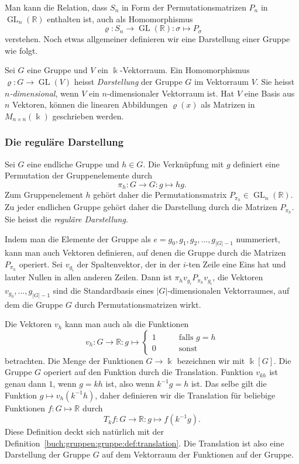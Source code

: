 Man kann die Relation, dass $S_n$ in Form der Permutationsmatrizen $P_n$
in $\operatorname{GL}_n(\mathbb{R})$ enthalten ist, auch als Homomorphismus
\[
\varrho
\colon 
S_n
\to
\operatorname{GL}(\mathbb{R})
:
\sigma
\mapsto
P_\sigma
\]
verstehen.
Noch etwas allgemeiner definieren wir eine Darstellung einer Gruppe
wie folgt.

\begin{definition}
Sei $G$ eine Gruppe und $V$ ein $\Bbbk$-Vektorraum.
Ein Homomorphismus $\varrho\colon G\to\operatorname{GL}(V)$
heisst {\em Darstellung} der Gruppe $G$ im Vektorraum $V$.
Sie heisst {\em $n$-dimensional}, wenn $V$ ein $n$-dimensionaler
Vektorraum ist.
Hat $V$ eine Basis aus $n$ Vektoren, können die linearen
Abbildungen $\varrho(x)$ als Matrizen in $M_{n\times n}(\Bbbk)$
geschrieben werden.
\end{definition}

\subsubsection{Die reguläre Darstellung}
Sei $G$ eine endliche Gruppe und $h\in G$.
Die Verknüpfung mit $g$ definiert eine Permutation der Gruppenelemente
durch
\[
\pi_h \colon G \to G : g \mapsto hg.
\]
Zum Gruppenelement $h$ gehört daher die Permutationsmatrix
$P_{\pi_h}\in\operatorname{GL}_n(\mathbb{R})$.
Zu jeder endlichen Gruppe gehört daher die Darstellung durch die
Matrizen $P_{\pi_h}$.
Sie heisst die {\em reguläre Darstellung}.

Indem man die Elemente der Gruppe als $e=g_0,g_1,g_2,\dots,g_{|G|-1}$
nummeriert, kann man auch Vektoren definieren, auf denen die
Gruppe durch die Matrizen $P_{\pi_h}$ operiert.
Sei $v_{g_i}$ der Spaltenvektor, der in der $i$-ten Zeile eine Eins
hat und lauter Nullen in allen anderen Zeilen.
Dann ist $\pi_{h}v_{g_i} P_{\pi_h}v_{g_i}$, die Vektoren
$v_{g_0},\dots,g_{|G|-1}$ sind die Standardbasis eines $|G|$-dimensionalen
Vektorraumes, auf dem die Gruppe $G$ durch Permutationsmatrizen wirkt.

Die Vektoren $v_h$ kann man auch als die Funktionen
\[
v_h
\colon
G\to\mathbb{R}
:
g\mapsto
\begin{cases}
1&\qquad\text{falls $g=h$}\\
0&\qquad\text{sonst}
\end{cases}
\]
betrachten.
Die Menge der Funktionen $G\to\Bbbk$ bezeichnen wir mit $\Bbbk[G]$.
Die Gruppe $G$ operiert auf den Funktion durch die Translation.
Funktion $v_{kh}$ ist genau dann $1$, wenn $g=kh$ ist, also wenn $k^{-1}g=h$
ist.
Das selbe gilt die Funktion $g\mapsto v_h(k^{-1}h)$, daher definieren wir
die Translation für beliebige Funktionen $f\colon G\mapsto \mathbb{R}$
durch
\[
T_kf\colon G\to\mathbb{R}:g\mapsto f(k^{-1}g).
\]
Diese Definition deckt sich natürlich mit der
Definition~\ref{buch:gruppen:gruppe:def:translation}.
Die Translation ist also eine Darstellung der Gruppe $G$ auf dem
Vektorraum der Funktionen auf der Gruppe.

